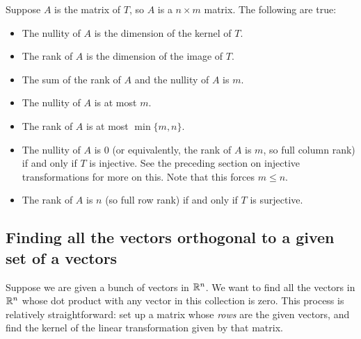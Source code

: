 \documentclass[10pt]{amsart}
\begin{document}
Suppose $A$ is the matrix of $T$, so $A$ is a $n \times m$ matrix. The
following are true:

\begin{itemize}
\item The nullity of $A$ is the dimension of the kernel of $T$.
\item The rank of $A$ is the dimension of the image of $T$.
\item The sum of the rank of $A$ and the nullity of $A$ is $m$.
\item The nullity of $A$ is at most $m$.
\item The rank of $A$ is at most $\min \{m,n \}$.
\item The nullity of $A$ is $0$ (or equivalently, the rank of $A$ is
  $m$, so full column rank) if and only if $T$ is injective. See the
  preceding section on injective transformations for more on
  this. Note that this forces $m \le n$.
\item The rank of $A$ is $n$ (so full row rank) if and only if $T$ is
  surjective.
\end{itemize}

\subsection{Finding all the vectors orthogonal to a given set of a vectors}

Suppose we are given a bunch of vectors in $\mathbb{R}^n$. We want to find all
the vectors in $\mathbb{R}^n$ whose dot product with any vector in this
collection is zero. This process is relatively straightforward: set up
a matrix whose {\em rows} are the given vectors, and find the kernel
of the linear transformation given by that matrix.
\end{document}
